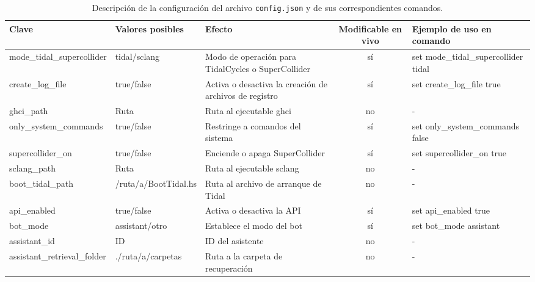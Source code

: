 \begin{landscape}
    \begin{table}[htbp]
        \centering
        \caption{Descripción de la configuración del archivo \texttt{config.json} y de sus correspondientes comandos.}
        \label{tab:config-description}
        \fontsize{9.5pt}{11pt}\selectfont
        \begingroup
        \begin{tabularx}{\linewidth}{lXlcl}
            \toprule
            \rowcolor{azul_unir} %
            \textbf{Clave} & \textbf{Valores posibles} & \textbf{Efecto} & \textbf{Modificable en vivo} & \textbf{Ejemplo de uso en comando} \\
            \midrule
        mode\_tidal\_supercollider & tidal/sclang & Modo de operación para TidalCycles o SuperCollider & sí & set mode\_tidal\_supercollider tidal \\
        create\_log\_file & \textcolor{truecolor}{true}/\textcolor{falsecolor}{false} & Activa o desactiva la creación de archivos de registro & sí & set create\_log\_file \textcolor{truecolor}{true} \\
        ghci\_path & Ruta & Ruta al ejecutable ghci & no & - \\
        only\_system\_commands & \textcolor{truecolor}{true}/\textcolor{falsecolor}{false} & Restringe a comandos del sistema & sí & set only\_system\_commands \textcolor{falsecolor}{false} \\
        supercollider\_on & \textcolor{truecolor}{true}/\textcolor{falsecolor}{false} & Enciende o apaga SuperCollider & sí & set supercollider\_on \textcolor{truecolor}{true} \\
        sclang\_path & Ruta & Ruta al ejecutable sclang & no & - \\
        boot\_tidal\_path & \textcolor{pathcolor}{/ruta/a/BootTidal.hs} & Ruta al archivo de arranque de Tidal & no & - \\
        api\_enabled & \textcolor{truecolor}{true}/\textcolor{falsecolor}{false} & Activa o desactiva la API & sí & set api\_enabled \textcolor{truecolor}{true} \\
        bot\_mode & assistant/otro & Establece el modo del bot & sí & set bot\_mode assistant \\
        assistant\_id & ID & ID del asistente & no & - \\
        assistant\_retrieval\_folder & \textcolor{pathcolor}{./ruta/a/carpetas} & Ruta a la carpeta de recuperación & no & - \\

\end{tabularx}
\end{table}
\end{landscape}
